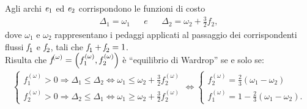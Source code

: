 \documentclass[11pt,largemargins]{homework}
\begin{document}
 \begin{alphaparts}
    \questionpart

    Agli archi $\emph{e}_{1}$ ed $\emph{e}_{2}$ corrispondono le funzioni di costo 
    \begin{align*}
    \Delta_{1}=\omega_{1} && e && \Delta_{2}=\omega_{2}+\frac{3}{2}f_{2},
    \end{align*}
   dove $\omega_{1}$ e $\omega_{2}$ rappresentano i pedaggi applicati al passaggio dei corrispondenti flussi $\emph{f}_{1}$ e $\emph{f}_{2}$, tali che $\emph{f}_{1}+\emph{f}_{2}=1$.\\
    Risulta che $\emph{f}^{(\omega)}=\left(f_{1}^{(\omega)},f_{2}^{(\omega)}\right)$  è  ``equilibrio  di  Wardrop'' se e solo se:
    \begin{align*}    
    \begin{cases}f_{1}^{(\omega)}>0  \Rightarrow  \Delta_{1}\leq\Delta_{2}  \Leftrightarrow  \omega_{1}  \leq  \omega_{2}+\frac{3}{2}f_{2}^{(\omega)}\\
    f_{2}^{(\omega)}>0  \Rightarrow  \Delta_{2}\leq\Delta_{1}  \Leftrightarrow  \omega_{1}  \geq  \omega_{2}+\frac{3}{2}f_{2}^{(\omega)}\end{cases}
    \Leftrightarrow \begin{cases}f_{2}^{(\omega)}=\frac{2}{3}\left(\omega_{1}-\omega_{2}\right)\\ f_{1}^{(\omega)}=1-\frac{2}{3}\left(\omega_{1}-\omega_{2}\right).\end{cases}
    \end{align*}
    

\end{alphaparts}
\end{document}
